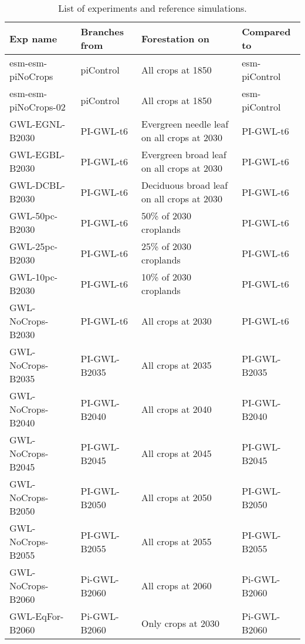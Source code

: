 \documentclass[]{article}
\begin{document}
\begin{table}[]
    \caption{List of experiments and reference simulations.}
    \label{tab:experiments}
    \begin{tabular}{llll}
\hline
Exp name             & Branches from & Forestation on               & Compared to       \\ \hline
esm-esm-piNoCrops    & piControl     & All crops at 1850            & esm-piControl     \\
esm-esm-piNoCrops-02 & piControl     & All crops at 1850            & esm-piControl     \\
GWL-EGNL-B2030       & PI-GWL-t6     & Evergreen needle leaf on all crops at 2030            & PI-GWL-t6         \\
GWL-EGBL-B2030       & PI-GWL-t6     & Evergreen broad leaf on all crops at 2030            & PI-GWL-t6         \\
GWL-DCBL-B2030       & PI-GWL-t6     & Deciduous broad leaf on all crops at 2030            & PI-GWL-t6         \\
GWL-50pc-B2030       & PI-GWL-t6     & 50\% of 2030 croplands       & PI-GWL-t6         \\
GWL-25pc-B2030       & PI-GWL-t6     & 25\% of 2030 croplands       & PI-GWL-t6         \\
GWL-10pc-B2030       & PI-GWL-t6     & 10\% of 2030 croplands       & PI-GWL-t6         \\
GWL-NoCrops-B2030    & PI-GWL-t6     & All crops at 2030            & PI-GWL-t6         \\
GWL-NoCrops-B2035    & PI-GWL-B2035  & All crops at 2035            & PI-GWL-B2035      \\
GWL-NoCrops-B2040    & PI-GWL-B2040  & All crops at 2040            & PI-GWL-B2040      \\
GWL-NoCrops-B2045    & PI-GWL-B2045  & All crops at 2045            & PI-GWL-B2045      \\
GWL-NoCrops-B2050    & PI-GWL-B2050  & All crops at 2050            & PI-GWL-B2050      \\
GWL-NoCrops-B2055    & PI-GWL-B2055  & All crops at 2055            & PI-GWL-B2055      \\
GWL-NoCrops-B2060    & Pi-GWL-B2060  & All crops at 2060            & Pi-GWL-B2060      \\
GWL-EqFor-B2060      & Pi-GWL-B2060  & Only crops at 2030           & Pi-GWL-B2060      \\
\end{tabular}
\end{table}
\end{document}
